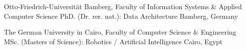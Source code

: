 \begin{cventries}



  \cventry
    {Otto-Friedrich-Universit\"{a}t Bamberg, Faculty of Information Systems \& Applied Computer Science}  %
    {PhD. (Dr. rer. nat.): Data Architecture} %
    {}%
    {Bamberg, Germany} %
    {	
    }


\vspace{-1ex}


  \cventry
    {The German University in Cairo, Faculty of Computer Science \& Engineering}  %
    {MSc. (Masters of Science): Robotics / Artificial Intelligence} %
    {}%
    {Cairo, Egypt} %
    {	
    }
    

\end{cventries}
